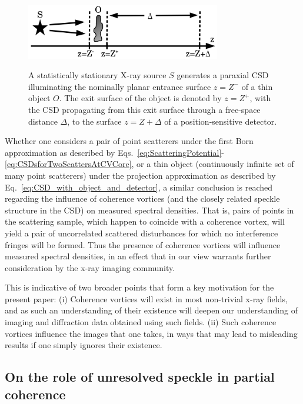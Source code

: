 \documentclass{iucr}              %
\begin{document}
\begin{figure}
\caption{A statistically stationary X-ray source $S$ generates a paraxial CSD illuminating the nominally planar entrance surface $z=Z^-$ of a thin object $O$.  The exit surface of the object is denoted by $z=Z^+$, with the CSD propagating from this exit surface through a free-space distance $\Delta$, to the surface $z=Z+\Delta$ of a position-sensitive detector.}
\includegraphics[width=8.5cm]{Figures/ImagingWithCoherenceVortex.png}
\label{fig:ImagingWithCoherenceVortex}
\end{figure}

Whether one considers a pair of point scatterers under the first Born approximation as described by Eqs.~\ref{eq:ScatteringPotential}-\ref{eq:CSDsforTwoScattersAtCVCore}, or a thin object (continuously infinite set of many point scatterers) under the projection approximation as described by Eq.~\ref{eq:CSD_with_object_and_detector}, a similar conclusion is reached regarding the influence of coherence vortices (and the closely related speckle structure in the CSD) on measured spectral densities.  That is, pairs of points in the scattering sample, which happen to coincide with a coherence vortex, will yield a pair of uncorrelated scattered disturbances for which no interference fringes will be formed.  Thus the presence of coherence vortices will influence measured spectral densities, in an effect that in our view warrants further consideration by the x-ray imaging community.  

This is indicative of two broader points that form a key motivation for the present paper: (i) Coherence vortices will exist in most non-trivial x-ray fields, and as such an understanding of their existence will deepen our understanding of imaging and diffraction data obtained using such fields. (ii) Such coherence vortices influence the images that one takes, in ways that may lead to misleading results if one simply ignores their existence.   

\subsection{On the role of unresolved speckle in partial coherence}\label{subsec:Discussion-part-2}
\end{document}
